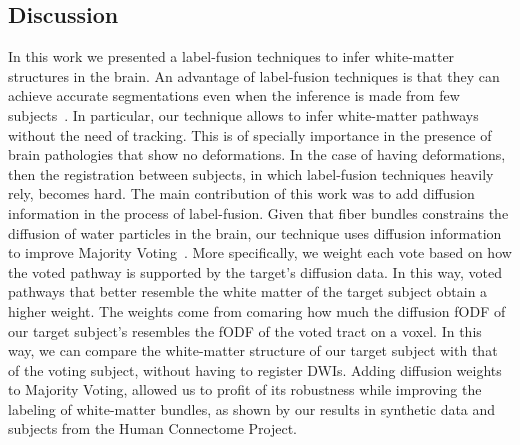 \subsection{Discussion}
In this work we presented a label-fusion techniques to infer white-matter
structures in the brain. An advantage of label-fusion techniques is that
they can achieve accurate segmentations even when the inference is
made from few subjects~\cite{Asman2013}. In particular, our technique allows to
infer white-matter pathways without the need of tracking. This is of specially
importance in the presence of brain pathologies that show no deformations. In the case of having
deformations, then the registration between subjects, in which label-fusion
techniques heavily rely, becomes hard. The main contribution of this work
was to add diffusion information in the process of label-fusion. Given that fiber
bundles constrains the diffusion of
water particles in the brain, our technique uses diffusion information to improve
Majority Voting~\cite{Xu1992}. More specifically, we weight each vote based on how
the voted pathway is supported by the target's diffusion data. In this way, voted
pathways that better resemble the white matter of the target subject obtain a 
higher weight. The weights come from comaring how much the diffusion fODF of our
target subject's resembles the fODF of the voted tract on a voxel. In this way, we
can compare the white-matter structure of our target subject with that of the voting
subject, without having to register DWIs. Adding diffusion weights to Majority Voting,
allowed us to profit of its robustness while improving the labeling of white-matter
bundles, as shown by our results in synthetic data and subjects from the Human
Connectome Project.

